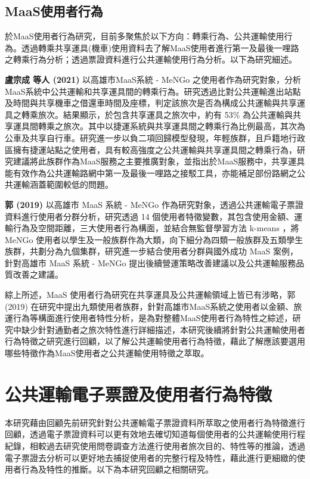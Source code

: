 \subsection{MaaS使用者行為}\label{maasux4f7fux7528ux8005ux884cux70ba}

於MaaS使用者行為研究，目前多聚焦於以下方向：轉乘行為、公共運輸使用行為。透過轉乘共享運具(機車)使用資料去了解MaaS使用者進行第一及最後一哩路之轉乘行為分析；透過票證資料進行公共運輸使用行為分析。以下為研究細述。

\textbf{盧宗成 等人 (2021)} 以高雄市MaaS系統 - MeNGo
之使用者作為研究對象，分析MaaS系統中公共運輸和共享運具間的轉乘行為。研究透過比對公共運輸進出站點及時間與共享機車之借還車時間及座標，判定該旅次是否為構成公共運輸與共享運具之轉乘旅次。結果顯示，於包含共享運具之旅次中，約有
53\%
為公共運輸與共享運具間轉乘之旅次。其中以捷運系統與共享運具間之轉乘行為比例最高，其次為公車及共享自行車。研究進一步以負二項回歸模型發現，年輕族群，且戶籍地行政區擁有捷運站點之使用者，具有較高強度之公共運輸與共享運具間之轉乘行為，研究建議將此族群作為MaaS服務之主要推廣對象，並指出於MaaS服務中，共享運具能有效作為公共運輸路網中第一及最後一哩路之接駁工具，亦能補足部份路網之公共運輸涵蓋範圍較低的問題。

\textbf{郭 (2019)} 以高雄市 MaaS 系統 - MeNGo
作為研究對象，透過公共運輸電子票證資料進行使用者分群分析，研究透過 14
個使用者特徵變數，其包含使用金額、運輸行為及空間距離，三大使用者行為構面，並結合無監督學習方法
k-means ，將 MeNGo
使用者以學生及一般族群作為大類，向下細分為四類一般族群及五類學生族群，共劃分為九個集群，研究進一步結合使用者分群與國外成功
MaaS 案例，針對高雄市 MaaS 系統 - MeNGo
提出後續營運策略改善建議以及公共運輸服務品質改善之建議。

綜上所述，MaaS 使用者行為研究在共享運具及公共運輸領域上皆已有涉略，郭
(2019)
在研究中提出九類使用者族群，針對高雄市MaaS系統之使用者以金額、旅運行為等構面進行使用者特性分析，是為對整體MaaS使用者行為特性之綜述，研究中缺少針對通勤者之旅次特性進行詳細描述，本研究後續將針對公共運輸使用者行為特徵之研究進行回顧，以了解公共運輸使用者行為特徵，藉此了解應該要選用哪些特徵作為MaaS使用者之公共運輸使用特徵之萃取。

\section{公共運輸電子票證及使用者行為特徵}\label{ux516cux5171ux904bux8f38ux96fbux5b50ux7968ux8b49ux53caux4f7fux7528ux8005ux884cux70baux7279ux5fb5}

本研究藉由回顧先前研究針對公共運輸電子票證資料所萃取之使用者行為特徵進行回顧，透過電子票證資料可以更有效地去確切知道每個使用者的公共運輸使用行程紀錄，相較過去研究使用問卷調查方法進行使用者旅次目的、特性等的推論，透過電子票證去分析可以更好地去捕捉使用者的完整行程及特性，藉此進行更細緻的使用者行為及特性的推斷。以下為本研究回顧之相關研究。

